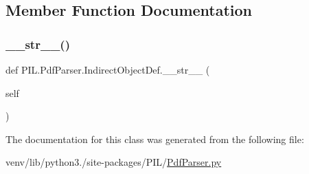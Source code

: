 \subsection{Member Function Documentation}
\mbox{\label{classPIL_1_1PdfParser_1_1IndirectObjectDef_a1f753e6bbf8ccec924c30f998430cb2c}} 
\subsubsection{\texorpdfstring{\+\_\+\+\_\+str\+\_\+\+\_\+()}{\_\_str\_\_()}}
{\footnotesize\ttfamily def P\+I\+L.\+Pdf\+Parser.\+Indirect\+Object\+Def.\+\_\+\+\_\+str\+\_\+\+\_\+ (\begin{DoxyParamCaption}\item[{}]{self }\end{DoxyParamCaption})}



The documentation for this class was generated from the following file\+:\begin{DoxyCompactItemize}
\item 
venv/lib/python3./site-\/packages/\+P\+I\+L/\hyperlink{PdfParser_8py}{Pdf\+Parser.\+py}\end{DoxyCompactItemize}
